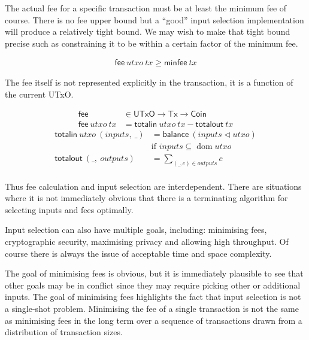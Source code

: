\documentclass{article}
\newcommand{\restrictdom}{\lhd}
\DeclareMathOperator{\dom}{dom}
\begin{document}
The actual fee for a specific transaction must be at least the minimum fee of
course. There is no fee upper bound but a ``good'' input selection
implementation will produce a relatively tight bound. We may wish to make that
tight bound precise such as constraining it to be within a certain factor of
the minimum fee.

\begin{equation}
\begin{split}
\mathsf{fee} ~ utxo ~ tx \geq \mathsf{minfee} ~ tx
\end{split}
\end{equation}

The fee itself is not represented explicitly in the transaction, it is a
function of the current UTxO.

\begin{equation}
\begin{split}
\mathsf{fee} & \in \mathsf{UTxO} \to \mathsf{Tx} \to \mathsf{Coin} \\
\mathsf{fee} ~ utxo ~ tx & = \mathsf{totalin} ~ utxo ~ tx - \mathsf{totalout} ~ tx
\end{split}
\end{equation}
%
\begin{equation}
\begin{split}
\mathsf{totalin} ~ utxo ~ (inputs, ~ \_) & = \mathsf{balance} ~ (inputs \restrictdom utxo) \\
                 & \text{if } inputs \subseteq \dom utxo \\
\mathsf{totalout} ~ (\_, ~ outputs) & = \sum_{(\_, c) \in outputs} c \\
\end{split}
\end{equation}

Thus fee calculation and input selection are interdependent. There are
situations where it is not immediately obvious that there is a terminating
algorithm for selecting inputs and fees optimally.

Input selection can also have multiple goals, including: minimising fees,
cryptographic security, maximising privacy and allowing high throughput. Of
course there is always the issue of acceptable time and space complexity.

The goal of minimising fees is obvious, but it is immediately plausible to see
that other goals may be in conflict since they may require picking other or
additional inputs. The goal of minimising fees highlights the fact that input
selection is not a single-shot problem. Minimising the fee of a single
transaction is not the same as minimising fees in the long term over a
sequence of transactions drawn from a distribution of transaction sizes.
\end{document}
